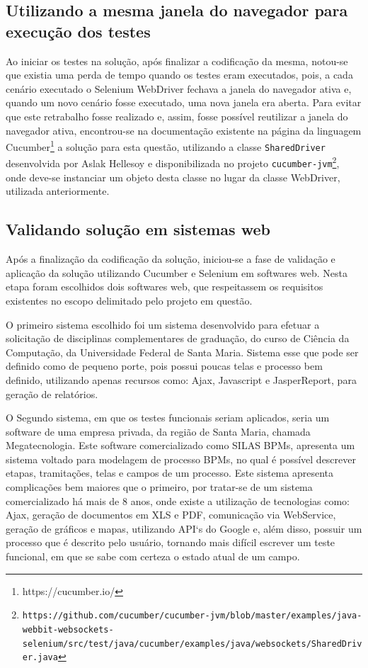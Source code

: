 \documentclass[tg]{mdtufsm}
\begin{document}
\subsection{Utilizando a mesma janela do navegador para execução dos testes}
Ao iniciar os testes na solução, após finalizar a codificação da mesma, notou-se que existia uma perda de tempo quando os testes eram executados, pois, a cada cenário executado o Selenium WebDriver fechava a janela do navegador ativa e, quando um novo cenário fosse executado, uma nova janela era aberta. Para evitar que este retrabalho fosse realizado e, assim, fosse possível reutilizar a janela do navegador ativa, encontrou-se na documentação existente na página da linguagem Cucumber\footnote{https://cucumber.io/} a solução para esta questão, utilizando a classe \texttt{SharedDriver} desenvolvida por Aslak Hellesoy e disponibilizada no projeto \texttt{cucumber-jvm\footnote{https://github.com/cucumber/cucumber-jvm/blob/master/examples/java-webbit-websockets-selenium/src/test/java/cucumber/examples/java/websockets/SharedDriver.java}}, onde deve-se instanciar um objeto desta classe no lugar da classe WebDriver, utilizada anteriormente.

\subsection{Validando solução em sistemas web}
Após a finalização da codificação da solução, iniciou-se a fase de validação e aplicação da solução utilizando Cucumber e Selenium em softwares web. Nesta etapa foram escolhidos dois softwares web, que respeitassem os requisitos existentes no escopo delimitado pelo projeto em questão. 

O primeiro sistema escolhido foi um sistema desenvolvido para efetuar a solicitação de disciplinas complementares de graduação, do curso de Ciência da Computação, da Universidade Federal de Santa Maria. Sistema esse que pode ser definido como de pequeno porte, pois possui poucas telas e processo bem definido, utilizando apenas recursos como: Ajax, Javascript e JasperReport, para geração de relatórios.

O Segundo sistema, em que os testes funcionais seriam aplicados, seria um software de uma empresa privada, da região de Santa Maria, chamada Megatecnologia. Este software comercializado como SILAS BPMs, apresenta
um sistema voltado para modelagem de processo BPMs, no qual é possível descrever etapas, tramitações, telas e campos de um processo. Este sistema apresenta complicações bem maiores que o primeiro, por tratar-se de um sistema comercializado há mais de 8 anos, onde existe a utilização de tecnologias como: Ajax, geração de documentos em XLS e PDF, comunicação via WebService, geração de gráficos e mapas, utilizando API`s do Google e, além disso, possuir um processo que é descrito pelo usuário, tornando mais difícil escrever um teste funcional, em que se sabe com certeza o estado atual de um campo.
\end{document}
